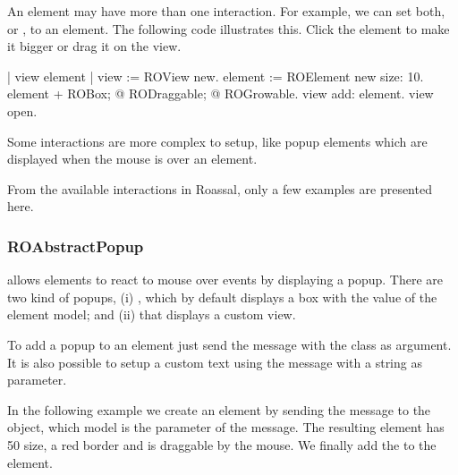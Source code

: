 \documentclass[a4paper,10pt,twoside]{book}
\begin{document}
An element may have more than one interaction. For example, we can set both,   or , to an element.
The following code illustrates this. Click the element to make it bigger or drag it on the view.

\begin{code}{}
| view element |
view := ROView new.
element := ROElement new size: 10.
element 
	+ ROBox;
	@ RODraggable; 
	@ ROGrowable.
view add: element.
view open.
\end{code}


Some interactions are more complex to setup, like popup elements which are displayed when the mouse is over an element. 

From the available interactions in Roassal, only a few examples are presented here.

\subsubsection{ROAbstractPopup}

 allows elements to react to mouse over events by displaying a popup. There are two kind of popups, (i) , which by default displays a box with the  value of the element model; and (ii)  that displays a custom view.

To add a popup to an element just send the  message with the  class as argument. It is also possible to setup a custom text using the  message with a string as parameter. 

In the following example we create an element by sending the  message to the  object, which model is the parameter of the message. The resulting element has 50 size, a red border and is draggable by the mouse. We finally add the  to the element.
\end{document}
